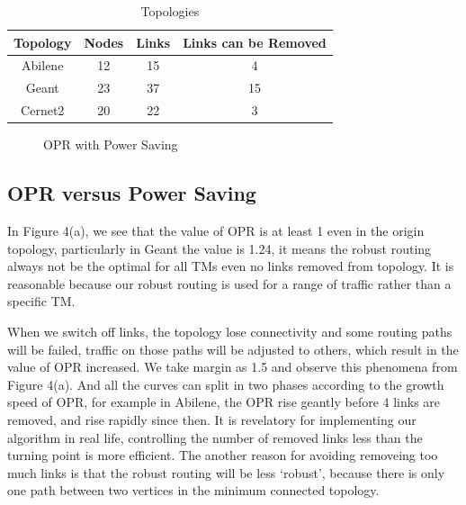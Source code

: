 \documentclass[conference]{IEEEtran}
\begin{document}
\begin{table}[!t]
\renewcommand{\arraystretch}{1}
\caption{Topologies}
\label{three topologies}
\centering
\begin{tabular}{|c|c|c|c|}
\hline
\bfseries Topology & \bfseries Nodes & \bfseries Links & \bfseries Links can be Removed \\
\hline
Abilene & 12 & 15 & 4 \\
\hline
Geant & 23 & 37 & 15 \\
\hline
Cernet2 & 20 & 22 & 3 \\
\hline
\end{tabular}
\end{table}

\begin{figure}[!t]
\centering
\vspace*{0.1in}
\caption{OPR with Power Saving}
\vspace*{0.1in}
\end{figure}


\subsection{OPR versus Power Saving}
In Figure 4(a), we see that the value of OPR is at least 1 even in the origin topology, particularly in Geant the value is 1.24,
it means the robust routing always not be the optimal for all TMs even no links removed from topology. It is reasonable because
our robust routing is used for a range of traffic rather than a specific TM.

When we switch off links, the topology lose connectivity and some routing paths will be failed, traffic on those paths will be 
adjusted to others, which result in the value of OPR increased. We take margin as 1.5 and observe this phenomena from Figure 4(a).
And all the curves can split in two phases according to the growth speed of OPR, for example in Abilene, the OPR rise geantly 
before 4 links are removed, and rise rapidly since then. It is revelatory for implementing our algorithm in real life, controlling
the number of removed links less than the turning point is more efficient. The another reason for avoiding removeing too much links
is that the robust routing will be less `robust', because there is only one path between two vertices in the minimum connected topology.
\end{document}
